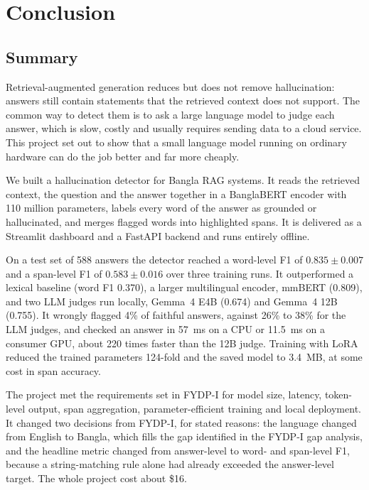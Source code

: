 %

\chapter{Conclusion}
\label{ch:conclusion}

\section{Summary}

Retrieval-augmented generation reduces but does not remove hallucination:
answers still contain statements that the retrieved context does not support.
The common way to detect them is to ask a large language model to judge each
answer, which is slow, costly and usually requires sending data to a cloud
service. This project set out to show that a small language model running on
ordinary hardware can do the job better and far more cheaply.

We built a hallucination detector for Bangla RAG systems. It reads the
retrieved context, the question and the answer together in a BanglaBERT encoder
with 110 million parameters, labels every word of the answer as grounded or
hallucinated, and merges flagged words into highlighted spans. It is delivered
as a Streamlit dashboard and a FastAPI backend and runs entirely offline.

On a test set of 588 answers the detector reached a word-level F1 of
$0.835 \pm 0.007$ and a span-level F1 of $0.583 \pm 0.016$ over three training
runs. It outperformed a lexical baseline (word F1 0.370), a larger multilingual
encoder, mmBERT (0.809), and two LLM judges run locally, Gemma~4 E4B (0.674)
and Gemma~4 12B (0.755). It wrongly flagged 4\% of faithful answers, against
26\% to 38\% for the LLM judges, and checked an answer in 57~ms on a CPU or
11.5~ms on a consumer GPU, about 220 times faster than the 12B judge. Training
with LoRA reduced the trained parameters 124-fold and the saved model to 3.4~MB,
at some cost in span accuracy.

The project met the requirements set in FYDP-I for model size, latency,
token-level output, span aggregation, parameter-efficient training and local
deployment. It changed two decisions from FYDP-I, for stated reasons: the
language changed from English to Bangla, which fills the gap identified in the
FYDP-I gap analysis, and the headline metric changed from answer-level to
word- and span-level F1, because a string-matching rule alone had already
exceeded the answer-level target. The whole project cost about \$16.

